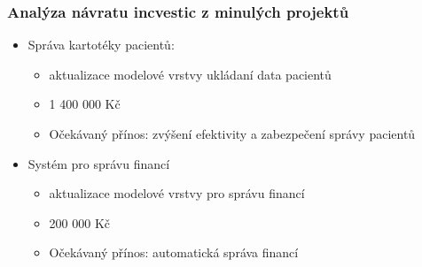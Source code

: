 \documentclass[11pt, a4paper, titlepage]{article}
\begin{document}
	\subsubsection*{Analýza návratu incvestic z minulých projektů}
	\begin{itemize}
		\item Správa kartotéky pacientů:
		\begin{itemize}
			\item aktualizace modelové vrstvy ukládaní data pacientů
			\item 1 400 000 Kč
			\item Očekávaný přínos: zvýšení efektivity a zabezpečení správy pacientů
		\end{itemize}
		\item Systém pro správu financí
		\begin{itemize}
			\item aktualizace modelové vrstvy pro správu financí
			\item 200 000 Kč
			\item Očekávaný přínos: automatická správa financí
		\end{itemize}
	\end{itemize}
\end{document}
